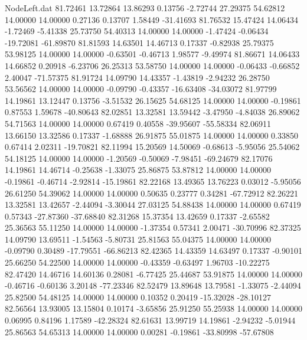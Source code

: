 \begin{filecontents}{NodeLeft.dat}
  81.72461   13.72864   13.86293     0.13756   -2.72744   27.29375   54.62812   14.00000   14.00000    0.27136    0.13707    1.58449  -31.41693
  81.76532   15.47424   14.06434    -1.72469   -5.41338   25.73750   54.40313   14.00000   14.00000   -1.47424   -0.06434  -19.72081  -61.89870
  81.81593   14.63501   14.46713     0.17337   -0.82938   25.79375   53.98125   14.00000   14.00000   -0.63501   -0.46713    1.98577   -9.49974
  81.86671   14.06433   14.66852     0.20918   -6.23706   26.25313   53.58750   14.00000   14.00000   -0.06433   -0.66852    2.40047  -71.57375
  81.91724   14.09790   14.43357    -1.43819   -2.94232   26.28750   53.56562   14.00000   14.00000   -0.09790   -0.43357  -16.63408  -34.03072
  81.97799   14.19861   13.12447     0.13756   -3.51532   26.15625   54.68125   14.00000   14.00000   -0.19861    0.87553    1.59678  -40.80643
  82.02851   13.32581   13.59442    -3.47950   -4.84038   26.89062   54.71563   14.00000   14.00000    0.67419    0.40558  -39.95607  -55.58334
  82.06911   13.66150   13.32586     0.17337   -1.68888   26.91875   55.01875   14.00000   14.00000    0.33850    0.67414    2.02311  -19.70821
  82.11994   15.20569   14.50069    -0.68613   -5.95056   25.54062   54.18125   14.00000   14.00000   -1.20569   -0.50069   -7.98451  -69.24679
  82.17076   14.19861   14.46714    -0.25638   -1.33075   25.86875   53.87812   14.00000   14.00000   -0.19861   -0.46714   -2.92814  -15.19861
  82.22168   13.49365   13.76223     0.03012   -5.95056   26.61250   54.39062   14.00000   14.00000    0.50635    0.23777    0.34281  -67.72912
  82.26221   13.32581   13.42657    -2.44094   -3.30044   27.03125   54.88438   14.00000   14.00000    0.67419    0.57343  -27.87360  -37.68840
  82.31268   15.37354   13.42659     0.17337   -2.65582   25.36563   55.11250   14.00000   14.00000   -1.37354    0.57341    2.00471  -30.70996
  82.37325   14.09790   13.69511    -1.54563   -5.80731   25.81563   55.04375   14.00000   14.00000   -0.09790    0.30489  -17.79551  -66.86213
  82.42365   14.43359   14.63497     0.17337   -0.90101   25.66250   54.22500   14.00000   14.00000   -0.43359   -0.63497    1.96703  -10.22275
  82.47420   14.46716   14.60136     0.28081   -6.77425   25.44687   53.91875   14.00000   14.00000   -0.46716   -0.60136    3.20148  -77.23346
  82.52479   13.89648   13.79581    -1.33075   -2.44094   25.82500   54.48125   14.00000   14.00000    0.10352    0.20419  -15.32028  -28.10127
  82.56564   13.93005   13.15804     0.10174   -3.65856   25.91250   55.25938   14.00000   14.00000    0.06995    0.84196    1.17589  -42.28324
  82.61631   13.99719   14.19861    -2.94232   -5.01944   25.86563   54.65313   14.00000   14.00000    0.00281   -0.19861  -33.80998  -57.67808

\end{filecontents}
